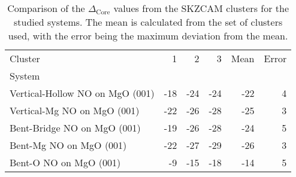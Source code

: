 \begin{table}
\caption{\label{tab:deltacore}Comparison of the $\Delta_\textrm{Core}$ values from the SKZCAM clusters for the studied systems. The mean is calculated from the set of clusters used, with the error being the maximum deviation from the mean.}
\begin{adjustbox}{center,max width=1\textwidth}
\begin{tabular}{lrrrrr}
\toprule
Cluster & 1 & 2 & 3 & Mean & Error \\ 
System &  &  &  &  &  \\
\midrule
Vertical-Hollow NO on MgO (001) & -18 & -24 & -24 & -22 & 4 \\
Vertical-Mg NO on MgO (001) & -22 & -26 & -28 & -25 & 3 \\
Bent-Bridge NO on MgO (001) & -19 & -26 & -28 & -24 & 5 \\
Bent-Mg NO on MgO (001) & -22 & -27 & -29 & -26 & 3 \\
Bent-O NO on MgO (001) & -9 & -15 & -18 & -14 & 5 \\
\bottomrule
\end{tabular}
\end{adjustbox}
\end{table}